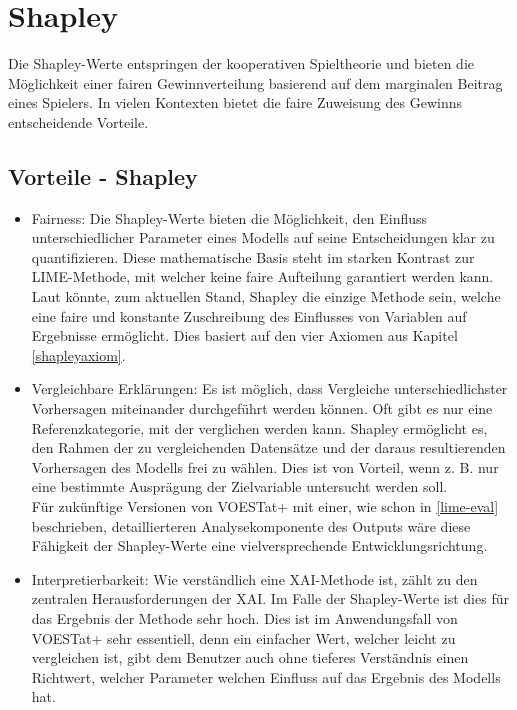 \documentclass[12pt,titlepage,oneside]{book}
\begin{document}
\newpage
\section{Shapley}
Die Shapley-Werte entspringen der kooperativen Spieltheorie und bieten die Möglichkeit einer fairen Gewinnverteilung basierend auf dem marginalen Beitrag eines Spielers. In vielen Kontexten bietet die faire Zuweisung des Gewinns entscheidende Vorteile.

\subsection{Vorteile - Shapley}
\begin{itemize}
    \item Fairness: Die Shapley-Werte bieten die Möglichkeit, den Einfluss unterschiedlicher Parameter eines Modells auf seine Entscheidungen klar zu quantifizieren. Diese mathematische Basis steht im starken Kontrast zur LIME-Methode, mit welcher keine faire Aufteilung garantiert werden kann. Laut \cite{molnar2020interpretable} könnte, zum aktuellen Stand, Shapley die einzige Methode sein, welche eine faire und konstante Zuschreibung des Einflusses von Variablen auf Ergebnisse ermöglicht. Dies basiert auf den vier Axiomen aus Kapitel \ref{shapleyaxiom}.
    \item Vergleichbare Erklärungen: Es ist möglich, dass Vergleiche unterschiedlichster Vorhersagen miteinander durchgeführt werden können. Oft gibt es nur eine Referenzkategorie, mit der verglichen werden kann. Shapley ermöglicht es, den Rahmen der zu vergleichenden Datensätze und der daraus resultierenden Vorhersagen des Modells frei zu wählen. Dies ist von Vorteil, wenn z. B. nur eine bestimmte Ausprägung der Zielvariable untersucht werden soll.\\
    Für zukünftige Versionen von VOESTat+ mit einer, wie schon in \ref{lime-eval} beschrieben, detaillierteren Analysekomponente des Outputs wäre diese Fähigkeit der Shapley-Werte eine vielversprechende Entwicklungsrichtung. %
    \item Interpretierbarkeit: Wie verständlich eine XAI-Methode ist, zählt zu den zentralen Herausforderungen der XAI. Im Falle der Shapley-Werte ist dies für das Ergebnis der Methode sehr hoch. Dies ist im Anwendungsfall von VOESTat+ sehr essentiell, denn ein einfacher Wert, welcher leicht zu vergleichen ist, gibt dem Benutzer auch ohne tieferes Verständnis einen Richtwert, welcher Parameter welchen Einfluss auf das Ergebnis des Modells hat.
\end{itemize}
\end{document}
